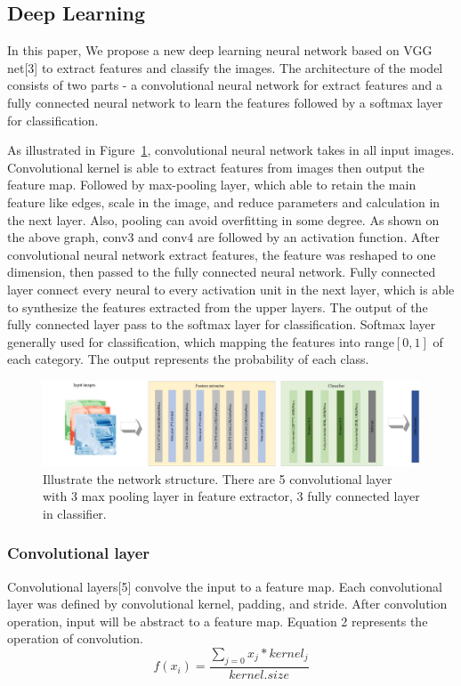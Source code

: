 \documentclass[runningheads]{llncs}
\begin{document}
\subsection{Deep Learning}
In this paper, We propose a new deep learning neural network based on VGG net[3] to extract features and classify the images. The architecture of the model consists of two parts - a convolutional neural network for extract features and a fully connected neural network to learn the features followed by a softmax layer for classification.

As illustrated in Figure~\ref{fig2}, convolutional neural network takes in all input images. Convolutional kernel is able to extract features from images then output the feature map. Followed by max-pooling layer, which able to retain the main feature like edges, scale in the image, and reduce parameters and calculation in the next layer. Also, pooling can avoid overfitting in some degree. As shown on the above graph, conv3 and conv4 are followed by an activation function. After convolutional neural network extract features, the feature was reshaped to one dimension, then passed to the fully connected neural network. Fully connected layer connect every neural to every activation unit in the next layer, which is able to synthesize the features extracted from the upper layers. The output of the fully connected layer pass to the softmax layer for classification. Softmax layer generally used for classification, which mapping the features into range$[0,1]$ of each category. The output represents the probability of each class.
\begin{figure}
	\includegraphics[width=\linewidth]{network.jpg}
	\caption{Illustrate the network structure. There are 5 convolutional layer with 3 max pooling layer in feature extractor, 3 fully connected layer in classifier.} \label{fig2}
\end{figure}

\subsubsection{Convolutional layer}
Convolutional layers[5] convolve the input to a feature map. Each convolutional layer was defined by convolutional kernel, padding, and stride. After convolution operation, input will be abstract to a feature map. Equation 2 represents the operation of convolution.
\begin{equation}
	f(x_i)=\frac{\sum_{j=0}x_j*kernel_j}{kernel.size}
\end{equation}
\end{document}
